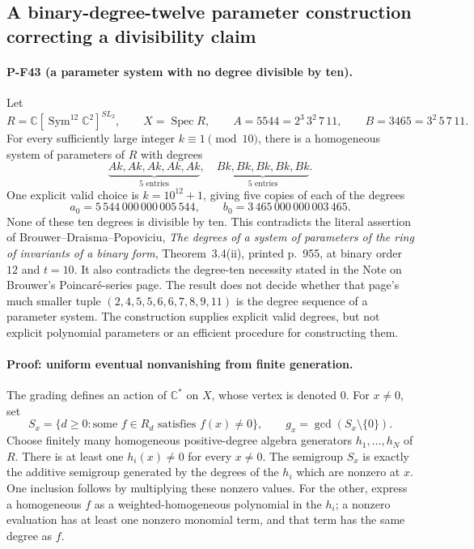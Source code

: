 \documentclass[11pt,a4paper]{article}
\begin{document}
\subsection{A binary-degree-twelve parameter construction correcting a divisibility claim}
\label{sec:binary12-hsop}

\paragraph{P-F43 (a parameter system with no degree divisible by ten).}
Let
\[
 R=\mathbb C[\operatorname{Sym}^{12}\mathbb C^2]^{SL_2},
 \qquad X=\operatorname{Spec}R,
 \qquad A=5544=2^3\,3^2\,7\,11,
 \qquad B=3465=3^2\,5\,7\,11.
\]
For every sufficiently large integer $k\equiv1\pmod {10}$,
there is a homogeneous system of parameters of $R$ with degrees
\[
 \underbrace{Ak,Ak,Ak,Ak,Ak}_{5\text{ entries}},\quad
 \underbrace{Bk,Bk,Bk,Bk,Bk}_{5\text{ entries}}.
 \tag{P-F43a}
\]
One explicit valid choice is $k=10^{12}+1$, giving five copies
of each of the degrees
\[
 a_0=5\,544\,000\,000\,005\,544,\qquad
 b_0=3\,465\,000\,000\,003\,465.
 \tag{P-F43a'}
\]
None of these ten degrees is divisible by ten. This contradicts
the literal assertion of Brouwer--Draisma--Popoviciu,
\emph{The degrees of a system of parameters of the ring of
invariants of a binary form}, Theorem~3.4(ii), printed p.~955,
at binary order $12$ and $t=10$. It also contradicts the
degree-ten necessity stated in the Note on Brouwer's
Poincar\'e-series page. The result does not decide whether
that page's much smaller tuple
$(2,4,5,5,6,6,7,8,9,11)$ is the degree sequence of a parameter
system. The construction supplies explicit valid degrees,
but not explicit polynomial parameters or an efficient
procedure for constructing them.

\paragraph{Proof: uniform eventual nonvanishing from finite generation.}
The grading defines an action of $\mathbb C^*$ on $X$, whose
vertex is denoted $0$. For $x\ne0$, set
\[
 S_x=\{d\ge0:\text{some }f\in R_d\text{ satisfies }f(x)\ne0\},
 \qquad g_x=\gcd(S_x\setminus\{0\}).
 \tag{P-F43b}
\]
Choose finitely many homogeneous positive-degree algebra
generators $h_1,\ldots,h_N$ of $R$. There is at least one
$h_i(x)\ne0$ for every $x\ne0$. The semigroup $S_x$ is exactly
the additive semigroup generated by the degrees of the
$h_i$ which are nonzero at $x$. One inclusion follows by
multiplying these nonzero values. For the other, express a
homogeneous $f$ as a weighted-homogeneous polynomial in the
$h_i$; a nonzero evaluation has at least one nonzero monomial
term, and that term has the same degree as $f$.
\end{document}
